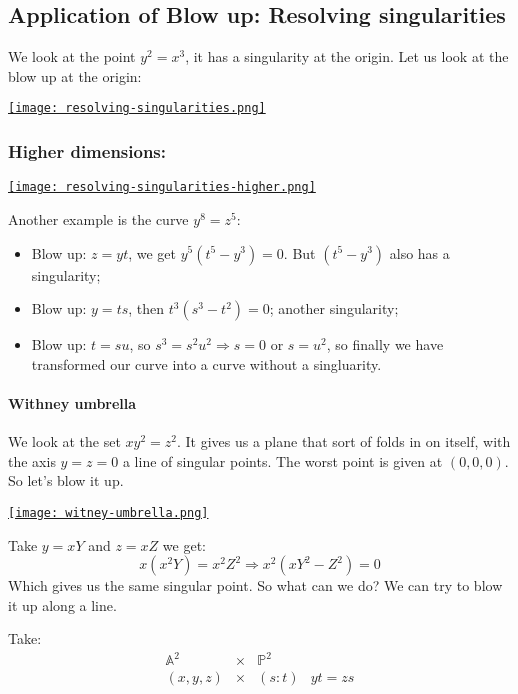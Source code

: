 \subsection{Application of Blow up: Resolving singularities}
We look at the point $y^2 = x^3$, it has a singularity at the origin. Let us look at the blow up at the origin:

\href{https://youtu.be/dGnfONlZwhQ?t=582}{\texttt{[image: resolving-singularities.png]}}

\subsubsection{Higher dimensions:}


\href{https://youtu.be/dGnfONlZwhQ?t=781}{\texttt{[image: resolving-singularities-higher.png]}}
\newline 

Another example is the curve $y^8 = z^5$:\begin{itemize}
    \item Blow up: $z = yt$, we get $y^5(t^5-y^3) = 0$. But $(t^5-y^3)$ also has a singularity;
    \item Blow up: $y=ts$, then $t^3(s^3-t^2) = 0$; another singularity;
    \item Blow up: $t = su$, so $s^3 = s^2u^2\Rightarrow s = 0$ or $s=u^2$, so finally we have transformed our curve into a curve without a singluarity.
\end{itemize}

\paragraph*{Withney umbrella}
We look at the set $xy^2 = z^2$. It gives us a plane that sort of folds in on itself, with the axis $y=z=0$ a line of singular points. The worst point is given at $(0,0,0)$. So let's blow it up.

\href{https://youtu.be/dGnfONlZwhQ?t=1189}{\texttt{[image: witney-umbrella.png]}}


Take $y = xY$ and $z = xZ$ we get:\[x(x^2Y) = x^2Z^2 \Rightarrow x^2(xY^2-Z^2) = 0\]
Which gives us the same singular point. So what can we do? We can try to blow it up along a line.


Take:\[\begin{array}{cccc}
    \mathbb{A}^2&\times& \mathbb{P}^2 &\\
    (x,y,z)&\times & (s\colon t)& yt = zs
\end{array}\]

